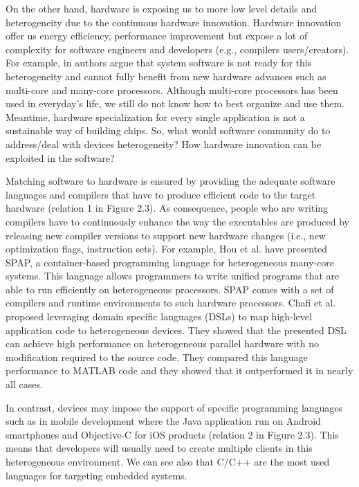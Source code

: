 On the other hand, hardware is exposing us to more low level details and heterogeneity due to the continuous hardware innovation. 
Hardware innovation offer us energy efficiency, performance improvement but expose a lot of complexity for software engineers and developers (e.g., compilers users/creators).
For example, in \cite{he2010computer} authors argue that system software is not ready for this heterogeneity and cannot fully benefit from new hardware advances such as multi-core and many-core processors. Although multi-core processors has been used in everyday’s life, we still do not know how to best organize and use them. 
Meantime, hardware specialization for every single application is not a sustainable way of building chips.
So, what would software community do to address/deal with devices heterogeneity? How hardware innovation can be exploited in the software?

Matching software to hardware is ensured by providing the adequate software languages and compilers that have to produce efficient code to the target hardware (relation 1 in Figure 2.3). As consequence, people who are writing compilers have to continuously enhance the way the executables are produced by releasing new compiler versions to support new hardware changes (i.e., new optimization flags, instruction sets).
For example, Hou et al.\cite{hou2010spap} have presented SPAP, a container-based programming language for heterogeneous many-core systems. This language allows programmers to write unified programs that are able to run efficiently on heterogeneous processors. SPAP comes with a set of compilers and runtime environments to such hardware processors. Chafi et al.\cite{chafi2010language,chafi2011domain} proposed leveraging domain specific languages (DSLs) to map high-level application code to
heterogeneous devices. They showed that the presented DSL can achieve high performance on heterogeneous parallel hardware with no modification required to the
source code. They compared this language performance to MATLAB code and they showed that it outperformed it in nearly all cases.

In contrast, devices may impose the support of specific programming languages such as in mobile development where the Java application run on Android smartphones and Objective-C for iOS products (relation 2 in Figure 2.3). This means that developers will usually need to create multiple clients in this heterogeneous environment. We can see also that C/C++ are the most used languages for targeting embedded systems.

